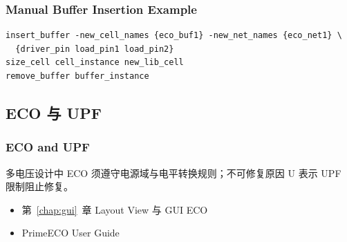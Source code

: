 \subsubsection*{Manual Buffer Insertion Example}

\begin{lstlisting}
insert_buffer -new_cell_names {eco_buf1} -new_net_names {eco_net1} \
  {driver_pin load_pin1 load_pin2}
size_cell cell_instance new_lib_cell
remove_buffer buffer_instance
\end{lstlisting}

\subsection{ECO 与 UPF}
\subsubsection*{ECO and UPF}

多电压设计中 ECO 须遵守电源域与电平转换规则；不可修复原因 U 表示 UPF 限制阻止修复。

\begin{seeAlsoBox}
\begin{itemize}
  \item 第~\ref{chap:gui}~章 Layout View 与 GUI ECO
  \item PrimeECO User Guide
\end{itemize}
\end{seeAlsoBox}

